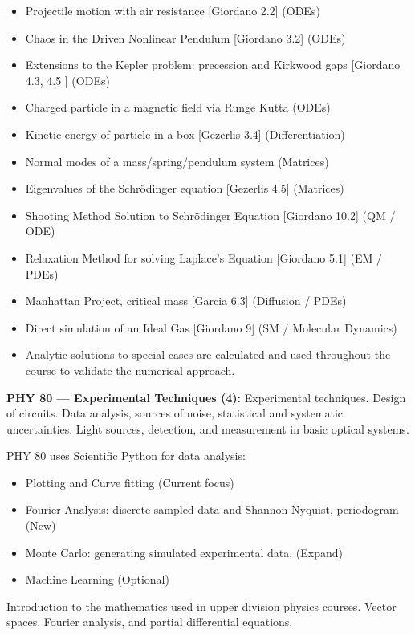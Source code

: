 \documentclass[12pt]{article}
\begin{document}
\begin{itemize}
\item Projectile motion with air resistance [Giordano 2.2] (ODEs)
\item Chaos in the Driven Nonlinear Pendulum [Giordano 3.2] (ODEs) 
\item Extensions to the Kepler problem:  precession and Kirkwood gaps [Giordano 4.3, 4.5 ] (ODEs)
\item Charged particle in a magnetic field via Runge Kutta  (ODEs)
\item Kinetic energy of particle in a box [Gezerlis 3.4] (Differentiation)
\item Normal modes of a mass/spring/pendulum system (Matrices)  
\item Eigenvalues of the Schr\"odinger equation [Gezerlis 4.5] (Matrices)
\item Shooting Method Solution to Schr\"odinger Equation [Giordano 10.2] (QM / ODE)
\item Relaxation Method for solving Laplace's Equation [Giordano 5.1] (EM / PDEs)
\item Manhattan Project, critical mass [Garcia 6.3] (Diffusion / PDEs)
\item Direct simulation of an Ideal Gas [Giordano 9] (SM / Molecular Dynamics)
\item Analytic solutions to special cases are calculated and used throughout the
  course to validate the numerical approach.
\end{itemize}  

\vskip 1cm
\noindent
{\bf PHY 80 --- Experimental Techniques (4):}
Experimental techniques. Design of circuits. Data analysis, sources of
noise, statistical and systematic uncertainties. Light sources,
detection, and measurement in basic optical systems.

PHY 80 uses Scientific Python for data analysis:
\begin{itemize}
\item Plotting and Curve fitting (Current focus)
\item Fourier Analysis: discrete sampled data and Shannon-Nyquist, periodogram (New)
\item Monte Carlo:  generating simulated experimental data. (Expand)
\item Machine Learning (Optional)
\end{itemize}

\newpage

\vskip 1cm
Introduction to the mathematics used in upper division physics
courses. Vector spaces, Fourier analysis, and partial differential
equations.
\end{document}
